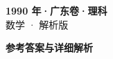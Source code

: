 \documentclass[zihao=-4, a4paper]{ctexart}
\begin{document}
\begin{center}
  {\Large\bfseries 1990 年·广东卷·理科}\\[4pt]
  {\large 数学 · 解析版}
\end{center}
\medskip
{}

\clearpage
{}
\begin{center}{\Large\bfseries 参考答案与详细解析}\end{center}
\medskip

\end{document}
